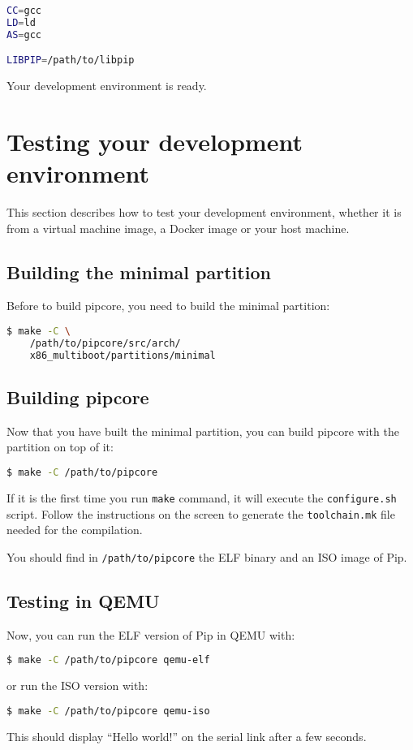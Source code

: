 \documentclass[10pt,a4paper,titlepage]{refart}
\begin{document}
\begin{lstlisting}[language=bash]
CC=gcc
LD=ld
AS=gcc

LIBPIP=/path/to/libpip
\end{lstlisting}

Your development environment is ready.

\section{Testing your development environment}

This section describes how to test your development environment, whether it is
from a virtual machine image, a Docker image or your host machine.

\subsection{Building the minimal partition}

Before to build pipcore, you need to build the minimal partition:

\begin{lstlisting}[language=bash]
    $ make -C \
    /path/to/pipcore/src/arch/
    x86_multiboot/partitions/minimal
\end{lstlisting}

\subsection{Building pipcore}

Now that you have built the minimal partition, you can build pipcore with the
partition on top of it:

\begin{lstlisting}[language=bash]
    $ make -C /path/to/pipcore
\end{lstlisting}

If it is the first time you run \texttt{make} command, it will execute the
\texttt{configure.sh} script. Follow the instructions on the screen to generate
the \texttt{toolchain.mk} file needed for the compilation.


You should find in \texttt{/path/to/pipcore} the ELF binary and an ISO image of
Pip.

\subsection{Testing in QEMU}

Now, you can run the ELF version of Pip in QEMU with:

\begin{lstlisting}[language=bash]
    $ make -C /path/to/pipcore qemu-elf
\end{lstlisting}

or run the ISO version with:

\begin{lstlisting}[language=bash]
    $ make -C /path/to/pipcore qemu-iso
\end{lstlisting}

This should display ``Hello world!'' on the serial link after a few seconds.
\end{document}
